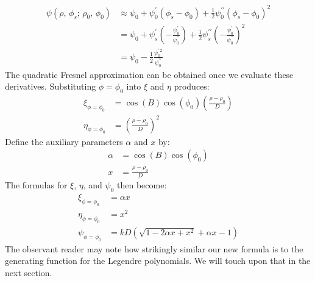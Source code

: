 \documentclass{article}
\theoremstyle{plain}
\begin{document}
        \begin{subequations}
            \begin{align}
                \psi(\rho,\,\phi_{s};\,\rho_{0},\,\phi_{0})
                &\approx\psi_{0}+\psi^{\prime}_{0}(\phi_{s}-\phi_{0})
                    +\frac{1}{2}\psi^{\prime\prime}_{0}(\phi_{s}-\phi_{0})^{2}\\
                &=\psi_{0}+\psi^{\prime}_{s}\left(
                    -\frac{\psi^{\prime}_{0}}{\psi^{\prime\prime}_{0}}
                \right)+
                \frac{1}{2}\psi^{\prime\prime}_{s}\left(
                    -\frac{\psi^{\prime}_{0}}{\psi^{\prime\prime}_{0}}
                \right)^{2}\\
                &=\psi_{0}
                    -\frac{1}{2}
                    \frac{\psi^{\prime\,2}_{0}}{\psi^{\prime\prime}_{0}}
            \end{align}
        \end{subequations}
        The quadratic Fresnel approximation can be obtained once we
        evaluate these derivatives. Substituting $\phi=\phi_{0}$
        into $\xi$ and $\eta$ produces:
        \begin{align}
            \xi_{\phi=\phi_{0}}
            &=\cos(B)\cos(\phi_{0})\left(
                \frac{\rho-\rho_{0}}{D}
            \right)\\
            \eta_{\phi=\phi_{0}}
            &=\left(\frac{\rho-\rho_{0}}{D}\right)^{2}
        \end{align}
        Define the auxiliary parameters $\alpha$ and $x$ by:
        \begin{align}
            \label{eqn:alpha_and_x}
            \alpha&=\cos(B)\cos(\phi_{0})\\
            x&=\frac{\rho-\rho_{0}}{D}
        \end{align}
        The formulas for $\xi$, $\eta$, and $\psi_{0}$ then become:
        \begin{align}
            \xi_{\phi=\phi_{0}}
            &=\alpha{x}\\
            \eta_{\phi=\phi_{0}}
            &=x^{2}\\
            \psi_{\phi=\phi_{0}}
            &=kD\left(
                \sqrt{1-2\alpha{x}+x^{2}}
                +\alpha{x}-1
            \right)
        \end{align}
        The observant reader may note how strikingly similar our new formula is
        to the generating function for the Legendre polynomials. We will
        touch upon that in the next section.
\end{document}
